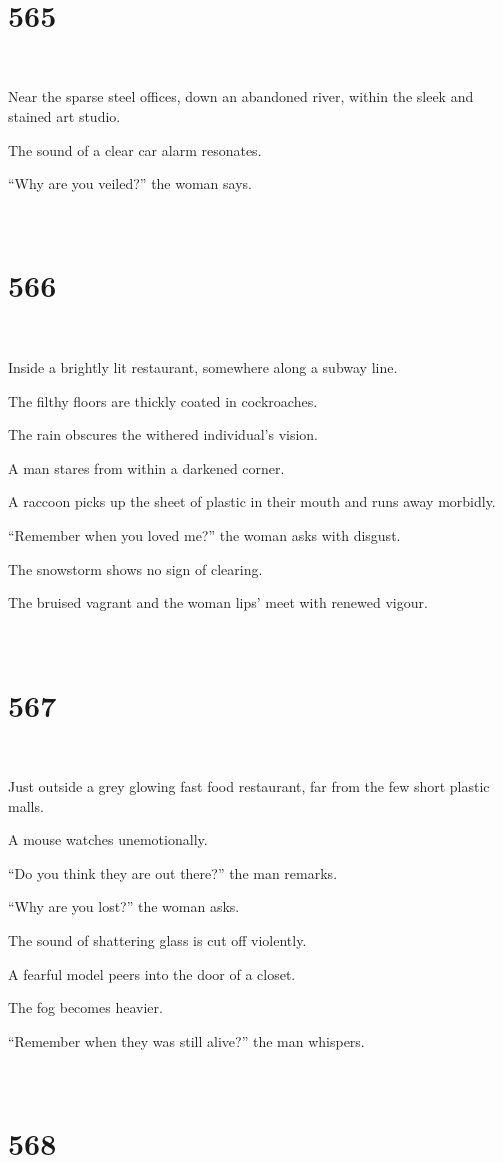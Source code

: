 \documentclass{report}
\begin{document}
~
\chapter*{565}
~

Near the sparse steel offices, down an abandoned river, within the sleek and stained art studio.

The sound of a clear car alarm resonates.

``Why are you veiled?'' the woman says.

~
\chapter*{566}
~

Inside a brightly lit restaurant, somewhere along a subway line.

The filthy floors are thickly coated in cockroaches.

The rain obscures the withered individual's vision.

A man stares from within a darkened corner.

A raccoon picks up the sheet of plastic in their mouth and runs away morbidly.

``Remember when you loved me?'' the woman asks with disgust.

The snowstorm shows no sign of clearing.

The bruised vagrant and the woman lips' meet with renewed vigour.

~
\chapter*{567}
~

Just outside a grey glowing fast food restaurant, far from the few short plastic malls.

A mouse watches unemotionally.

``Do you think they are out there?'' the man remarks.

``Why are you lost?'' the woman asks.

The sound of shattering glass is cut off violently.

A fearful model peers into the door of a closet.

The fog becomes heavier.

``Remember when they was still alive?'' the man whispers.

~
\chapter*{568}
~
\end{document}
